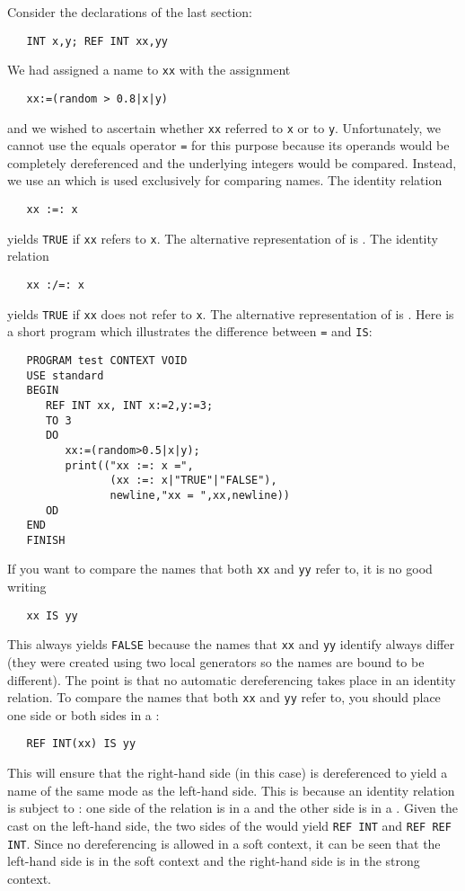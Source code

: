 Consider the declarations of the last section:
\begin{verbatim}
   INT x,y; REF INT xx,yy
\end{verbatim}
\noindent
We had assigned a name to \verb|xx| with the assignment
\begin{verbatim}
   xx:=(random > 0.8|x|y)
\end{verbatim}
\noindent
and we wished to ascertain whether \verb|xx| referred to \verb|x| or
to \verb|y|. Unfortunately, we cannot use the equals operator
\verb|=| for this purpose because its operands would be completely
dereferenced and the underlying integers would be compared. Instead,
we use an  which is
used exclusively for comparing names. The identity relation
\begin{verbatim}
   xx :=: x
\end{verbatim}
\noindent
yields \verb|TRUE| if \verb|xx| refers to \verb|x|. The alternative
representation of \ixtt{:=:} is . The identity relation
\begin{verbatim}
   xx :/=: x
\end{verbatim}
\noindent
yields \verb|TRUE| if \verb|xx| does not refer to \verb|x|. The
alternative representation of \ixtt{:/=:} is
. Here is a short program which
illustrates the difference between \verb|=| and \verb|IS|:
\begin{verbatim}
   PROGRAM test CONTEXT VOID
   USE standard
   BEGIN
      REF INT xx, INT x:=2,y:=3;
      TO 3
      DO
         xx:=(random>0.5|x|y);
         print(("xx :=: x =",
                (xx :=: x|"TRUE"|"FALSE"),
                newline,"xx = ",xx,newline))
      OD
   END
   FINISH
\end{verbatim}
\noindent
If you want to compare the names that both \verb|xx| and \verb|yy|
refer to, it is no good writing
\begin{verbatim}
   xx IS yy
\end{verbatim}
\noindent
This always yields \verb|FALSE| because the names that \verb|xx| and
\verb|yy| identify always differ (they were created using two local
generators so the names are bound to be different). The point is that
no automatic dereferencing takes place in an identity relation. To
compare the names that both \verb|xx| and \verb|yy| refer to, you
should place one side or both sides in a :
\begin{verbatim}
   REF INT(xx) IS yy
\end{verbatim}
\noindent
This will ensure that the right-hand side (in this case) is
dereferenced to yield a name of the same mode as the left-hand side.
This is because an identity relation is subject to :
one side of the relation is in a  and
the other side is in a .  Given
the cast on the left-hand side, the two sides of the
 would yield \verb|REF INT|
and \verb|REF REF INT|.  Since no dereferencing is allowed in a soft
context, it can be seen that the left-hand side is in the soft
context and the right-hand side is in the strong context.

